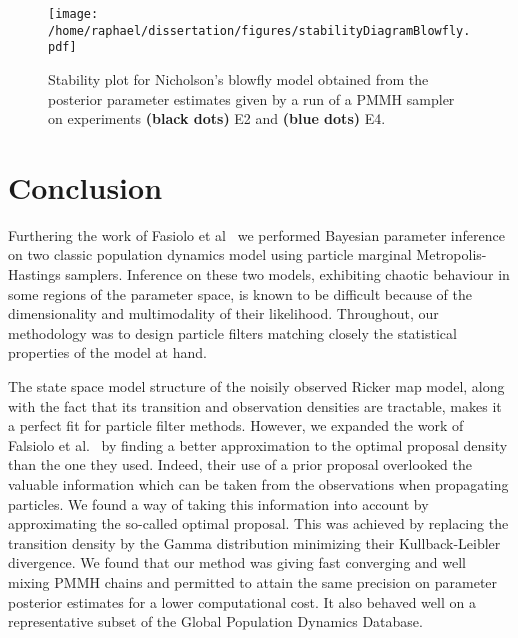 \documentclass[12pt]{article}
\begin{document}
	\begin{figure}[htb]
		\vspace{5mm}
		\centering
		\begin{minipage}{0.9\textwidth}
			\centering
			\texttt{[image: /home/raphael/dissertation/figures/stabilityDiagramBlowfly.pdf]}
		\end{minipage}
		\caption[Stability plot for Nicholson's blowfly model obtained from the posterior parameter estimates given by a run of a PMMH sampler on experimental data]{Stability plot for Nicholson's blowfly model obtained from the posterior parameter estimates given by a run of a PMMH sampler on experiments \textbf{(black dots)} E2 and \textbf{(blue dots)} E4.}
		\label{fig:accordance}
		\vspace{5mm}
	\end{figure}
	
\clearpage	
	\section{Conclusion}
	Furthering the work of Fasiolo et al~\cite{fasiolo2014statistical} we performed Bayesian parameter inference on two classic population dynamics model using particle marginal Metropolis-Hastings samplers. Inference on these two models, exhibiting chaotic behaviour in some regions of the parameter space, is known to be difficult because of the dimensionality and multimodality of their likelihood. Throughout, our methodology was to design particle filters matching closely the statistical properties of the model at hand.
	
	The state space model structure of the noisily observed Ricker map model, along with the fact that its transition and observation densities are tractable, makes it a perfect fit for particle filter methods. However, we expanded the work of Falsiolo et al.~\cite{fasiolo2014statistical} by finding a better approximation to the optimal proposal density than the one they used. Indeed, their use of a prior proposal overlooked the valuable information which can be taken from the observations when propagating particles. We found a way of taking this information into account by approximating the so-called optimal proposal. This was achieved by replacing the transition density by the Gamma distribution minimizing their Kullback-Leibler divergence. We found that our method was giving fast converging and well mixing PMMH chains and permitted to attain the same precision on parameter posterior estimates for a lower computational cost. It also behaved well on a representative subset of the Global Population Dynamics Database.
	
\end{document}

